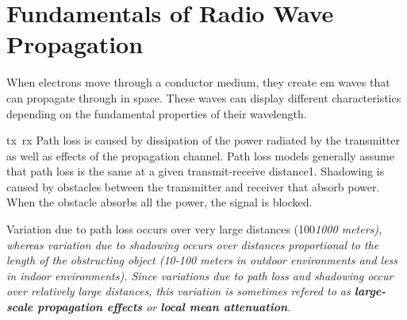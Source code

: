 \section{Fundamentals of Radio Wave Propagation}
When electrons move through a conductor medium, they create \gls{em}  waves that can propagate through in space.
These waves can display different characteristics depending on the fundamental properties of their wavelength.


\gls{tx}~\gls{rx}
Path loss is caused by dissipation of the power radiated by the transmitter as well as effects of the propagation channel.
Path loss models generally assume that path loss is the same at a given transmit-receive distance1.
Shadowing is caused by obstacles between the transmitter and receiver that absorb power.
When the obstacle absorbs all the power, the signal is blocked.

Variation due to path loss occurs over very large distances (100\em1000 meters), whereas variation due to shadowing occurs over distances proportional to the length of the obstructing object (10-100 meters in outdoor environments and less in indoor environments).
Since variations due to path loss and shadowing occur over relatively large distances, this variation is sometimes refered to as \textbf{large-scale propagation effects} or \textbf{local mean attenuation}.
